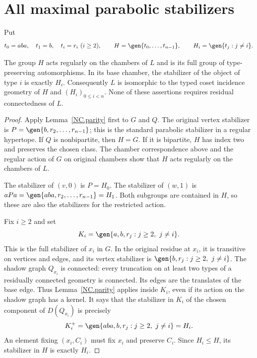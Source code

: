 \section{All maximal parabolic stabilizers}
Put
\[
 t_0=aba,\quad t_1=b,\quad t_i=r_i\ (i\ge2),
 \qquad H=\gen{t_0,\ldots,t_{n-1}},\qquad
 H_i=\gen{t_j:j\ne i}.
\]
\begin{theorem}\label{NC.cosets}
The group $H$ acts regularly on the chambers of $L$ and is its
full group of type-preserving automorphisms. In its base chamber,
the stabilizer of the object of type $i$ is exactly $H_i$.
Consequently $L$ is isomorphic to the typed coset incidence
geometry of $H$ and $(H_i)_{0\le i<n}$.
None of these assertions requires residual connectedness of $L$.
\end{theorem}
\begin{proof}
Apply Lemma~\ref{NC.parity} first to $G$ and $Q$. The original
vertex stabilizer is $P=\gen{b,r_2,\ldots,r_{n-1}}$; this is
the standard parabolic stabilizer in a regular hypertope.
If $Q$ is nonbipartite, then $H=G$. If it is bipartite, $H$
has index two and preserves the chosen class. The chamber
correspondence above and the regular action of $G$ on original
chambers show that $H$ acts regularly on the chambers of $L$.

The stabilizer of $(v,0)$ is $P=H_0$. The stabilizer of $(w,1)$
is $aPa=\gen{aba,r_2,\ldots,r_{n-1}}=H_1$.
Both subgroups are contained in $H$, so these are also the
stabilizers for the restricted action.

Fix $i\ge2$ and set
\[
 K_i=\gen{a,b,r_j: j\ge2,\ j\ne i}.
\]
This is the full stabilizer of $x_i$ in $G$. In the original
residue at $x_i$, it is transitive on vertices and edges, and
its vertex stabilizer is $\gen{b,r_j:j\ge2,\ j\ne i}$.
The shadow graph $Q_{x_i}$ is connected: every truncation on
at least two types of a residually connected geometry is
connected. Its edges are the translates of the base edge.
Thus Lemma~\ref{NC.parity} applies inside $K_i$, even if its action
on the shadow graph has a kernel. It says that the stabilizer
in $K_i$ of the chosen component of $D(Q_{x_i})$ is precisely
\[
 K_i^+=\gen{aba,b,r_j:j\ge2,\ j\ne i}=H_i.
\]
An element fixing $(x_i,C_i)$ must fix $x_i$ and preserve $C_i$.
Since $H_i\le H$, its stabilizer in $H$ is exactly $H_i$.


\end{proof}
